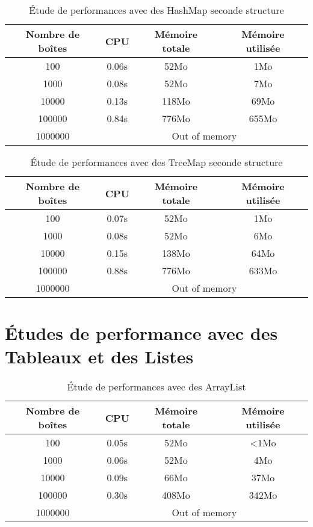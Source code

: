 \begin{table}[htbp]
  \centering
\begin{tabular}{|c|c|c|c|}
\hline
Nombre de boîtes & CPU & Mémoire totale & Mémoire utilisée\\
\hline
100 & 0.06s & 52Mo & 1Mo\\
\hline
1000 & 0.08s & 52Mo & 7Mo\\
\hline
10000 & 0.13s & 118Mo & 69Mo\\
\hline
100000 & 0.84s & 776Mo & 655Mo\\
\hline
1000000 & \multicolumn{3}{|c|}{Out of memory}\\
\hline
\end{tabular}
\caption{Étude de performances avec des HashMap seconde structure}
\label{tab:hashmap3}
\end{table}



\begin{table}[htbp]
  \centering
\begin{tabular}{|c|c|c|c|}
\hline
Nombre de boîtes & CPU & Mémoire totale & Mémoire utilisée\\
\hline
100 & 0.07s & 52Mo & 1Mo\\
\hline
1000 & 0.08s & 52Mo & 6Mo\\
\hline
10000 & 0.15s & 138Mo & 64Mo\\
\hline
100000 & 0.88s & 776Mo & 633Mo\\
\hline
1000000 & \multicolumn{3}{|c|}{Out of memory}\\
\hline
\end{tabular}
\caption{Étude de performances avec des TreeMap seconde structure}
\label{tab:treemap2}
\end{table}

\section{Études de performance avec des Tableaux et des Listes}

\begin{table}[h]
  \centering
\begin{tabular}{|c|c|c|c|}
\hline
Nombre de boîtes & CPU & Mémoire totale & Mémoire utilisée\\
\hline
100 & 0.05s & 52Mo & <1Mo\\
\hline
1000 & 0.06s & 52Mo & 4Mo\\
\hline
10000 & 0.09s & 66Mo & 37Mo\\
\hline
100000 & 0.30s & 408Mo & 342Mo\\
\hline
1000000 & \multicolumn{3}{|c|}{Out of memory}\\
\hline
\end{tabular}
\caption{Étude de performances avec des ArrayList}
 \label{tab:arraylist}
\end{table}


